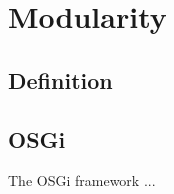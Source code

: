 \section{Modularity}
\label{sec:modularity}


\subsection{Definition}

\subsection{\acs{OSGi}}
The \gls{OSGi} framework ...